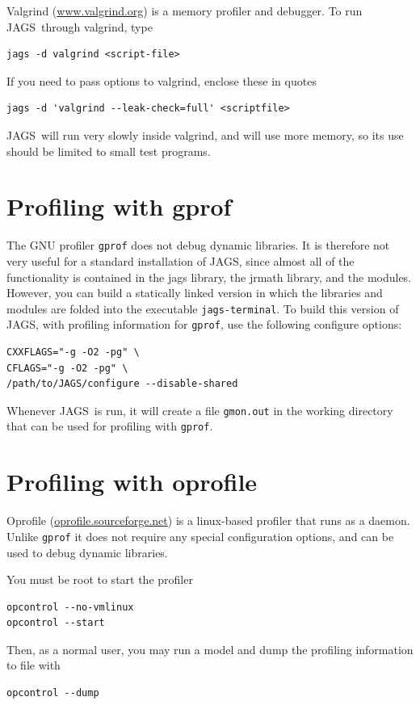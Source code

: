 \documentclass[11pt, a4paper, titlepage]{report}
\newcommand{\JAGS}{\textsf{JAGS}}
\begin{document}
Valgrind (\url{www.valgrind.org}) is a memory profiler and
debugger. To run \JAGS\ through valgrind, type
\begin{verbatim}
jags -d valgrind <script-file>
\end{verbatim}
If you need to pass options to valgrind, enclose these in quotes
\begin{verbatim}
jags -d 'valgrind --leak-check=full' <scriptfile>
\end{verbatim}
\JAGS\ will run very slowly inside valgrind, and will use more memory,
so its use should be limited to small test programs.

\section{Profiling with gprof}

The GNU profiler \texttt{gprof} does not debug dynamic libraries. It
is therefore not very useful for a standard installation of \JAGS,
since almost all of the functionality is contained in the jags
library, the jrmath library, and the modules.  However, you can build
a statically linked version in which the libraries and modules are
folded into the executable \texttt{jags-terminal}. To build this
version of \JAGS, with profiling information for \texttt{gprof}, use
the following configure options:
\begin{verbatim}
CXXFLAGS="-g -O2 -pg" \
CFLAGS="-g -O2 -pg" \
/path/to/JAGS/configure --disable-shared
\end{verbatim}
Whenever \JAGS\ is run, it will create a file \texttt{gmon.out} in
the working directory that can be used for profiling with \texttt{gprof}.

\section{Profiling with oprofile}

Oprofile (\url{oprofile.sourceforge.net}) is a linux-based profiler
that runs as a daemon. Unlike \texttt{gprof} it does not require any
special configuration options, and can be used to debug dynamic libraries.

You must be root to start the profiler
\begin{verbatim}
opcontrol --no-vmlinux
opcontrol --start
\end{verbatim}
Then, as a normal user, you may run a model and dump the profiling
information to file with
\begin{verbatim}
opcontrol --dump
\end{verbatim}
\end{document}

